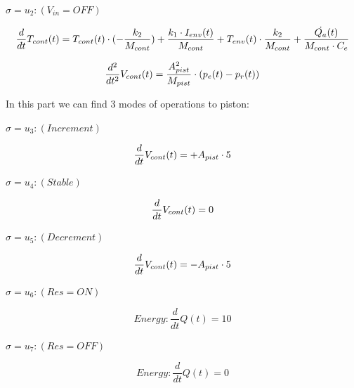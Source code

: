 \documentclass[a4paper,12pt,twoside,openright]{book}
\begin{document}
\vspace{5mm}

$\sigma = u_2: (V_{in} = OFF)$

\begin{equation}\frac{d}{dt}T_{cont}(t) = T_{cont}(t)\cdot(-\frac{k_2}{M_{cont}})+\frac{k_1\cdot I_{env}(t)}{M_{cont}} + T_{env}(t)\cdot\frac{k_2}{M_{cont}} +  \frac{\dot{Q_{a}}(t)}{M_{cont}\cdot C_e}   
\end{equation}

\begin{equation}
        \frac{d^2}{dt^2}V_{cont}(t) = \frac{A_{pist}^2}{M_{pist}}\cdot(p_{e}(t)-p_{r}(t))   
\end{equation}

In this part we can find 3 modes of operations to piston:

\vspace{5mm}

$\sigma = u_3:(Increment)$

\begin{equation}
        \frac{d}{dt}V_{cont}(t) = +A_{pist} \cdot 5  
\end{equation}

\vspace{5mm}

$\sigma = u_4:(Stable)$

\begin{equation}
        \frac{d}{dt}V_{cont}(t) = 0  
\end{equation}

\vspace{5mm}
$\sigma = u_5:(Decrement)$

\begin{equation}
        \frac{d}{dt}V_{cont}(t) = -A_{pist} \cdot 5  
\end{equation}


\vspace{5mm}

$\sigma = u_6:(Res = ON)$

\begin{equation}
        Energy:
        \frac{d}{dt}Q(t) = 10  
\end{equation}

\vspace{5mm}

$\sigma = u_7:(Res = OFF)$

\begin{equation}
        Energy:
        \frac{d}{dt}Q(t) = 0  
\end{equation}
\end{document}
